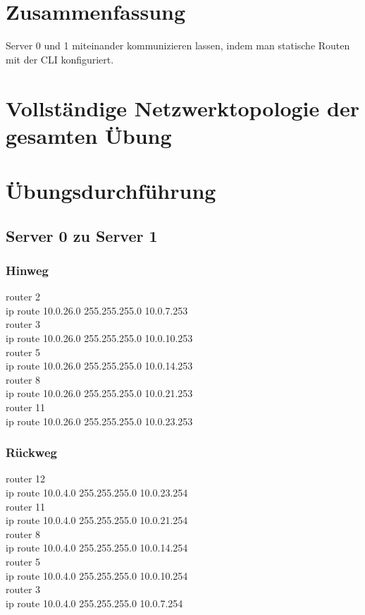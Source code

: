\documentclass[a4paper]{article}
\begin{document}
\section{Zusammenfassung}
Server 0 und 1 miteinander kommunizieren lassen, indem man statische Routen mit der CLI konfiguriert.


\newpage

\section{Vollständige Netzwerktopologie der gesamten Übung}

\newpage

\section{Übungsdurchführung}
\subsection{Server 0 zu Server 1}

\subsubsection{Hinweg}
router 2\\
ip route 10.0.26.0 255.255.255.0 10.0.7.253 \\
router 3\\
ip route 10.0.26.0 255.255.255.0 10.0.10.253\\
router 5\\
ip route 10.0.26.0 255.255.255.0 10.0.14.253\\
router 8\\
ip route 10.0.26.0 255.255.255.0 10.0.21.253\\
router 11\\
ip route 10.0.26.0 255.255.255.0 10.0.23.253\\

\subsubsection{Rückweg}
router 12\\
ip route 10.0.4.0 255.255.255.0 10.0.23.254\\
router 11\\
ip route 10.0.4.0 255.255.255.0 10.0.21.254\\
router 8\\
ip route 10.0.4.0 255.255.255.0 10.0.14.254\\
router 5\\
ip route 10.0.4.0 255.255.255.0 10.0.10.254\\
router 3\\
ip route 10.0.4.0 255.255.255.0 10.0.7.254\\
\end{document}
